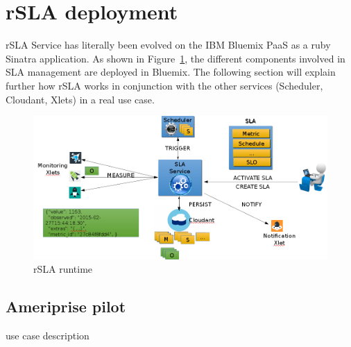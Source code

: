 \section{rSLA deployment }

rSLA Service has literally been evolved on the IBM Bluemix PaaS as a ruby Sinatra application. As shown in Figure~\ref{fig:runtime}, the different components involved in SLA 
management are deployed in Bluemix. The following section will explain further how rSLA works in conjunction with the other services (Scheduler, Cloudant, Xlets) in a real use 
case. 



\begin{figure}[H]
\centering
\includegraphics[width=\textwidth]{pics/runtime.png}
\caption{\label{fig:runtime} rSLA runtime}
\end{figure}


\subsection{Ameriprise pilot}
use case description

